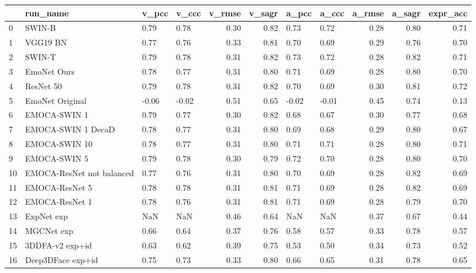 \begin{tabular}{llllrrllrrr}
\toprule
{} &                   run\_name & v\_pcc & v\_ccc &  v\_rmse &  v\_sagr & a\_pcc & a\_ccc &  a\_rmse &  a\_sagr &  expr\_acc \\
\midrule
0  &                     SWIN-B &  0.79 &  0.78 &    0.30 &    0.82 &  0.73 &  0.72 &    0.28 &    0.80 &      0.71 \\
1  &                   VGG19 BN &  0.77 &  0.76 &    0.33 &    0.81 &  0.70 &  0.69 &    0.29 &    0.76 &      0.70 \\
2  &                     SWIN-T &  0.79 &  0.78 &    0.31 &    0.82 &  0.73 &  0.72 &    0.28 &    0.82 &      0.71 \\
3  &                EmoNet Ours &  0.78 &  0.77 &    0.31 &    0.80 &  0.71 &  0.69 &    0.28 &    0.80 &      0.70 \\
4  &                  ResNet 50 &  0.79 &  0.78 &    0.31 &    0.82 &  0.70 &  0.69 &    0.30 &    0.81 &      0.72 \\
5  &            EmoNet Original & -0.06 & -0.02 &    0.51 &    0.65 & -0.02 & -0.01 &    0.45 &    0.74 &      0.13 \\
6  &               EMOCA-SWIN 1 &  0.79 &  0.77 &    0.30 &    0.82 &  0.68 &  0.67 &    0.30 &    0.77 &      0.68 \\
7  &         EMOCA-SWIN 1 DecaD &  0.78 &  0.77 &    0.31 &    0.80 &  0.69 &  0.68 &    0.29 &    0.80 &      0.67 \\
8  &              EMOCA-SWIN 10 &  0.78 &  0.77 &    0.31 &    0.80 &  0.71 &  0.71 &    0.28 &    0.80 &      0.71 \\
9  &               EMOCA-SWIN 5 &  0.79 &  0.78 &    0.30 &    0.79 &  0.72 &  0.70 &    0.28 &    0.80 &      0.70 \\
10 &  EMOCA-ResNet not balanced &  0.77 &  0.76 &    0.31 &    0.80 &  0.70 &  0.69 &    0.28 &    0.82 &      0.69 \\
11 &             EMOCA-ResNet 5 &  0.78 &  0.78 &    0.31 &    0.81 &  0.71 &  0.69 &    0.28 &    0.82 &      0.69 \\
12 &             EMOCA-ResNet 1 &  0.78 &  0.76 &    0.31 &    0.81 &  0.71 &  0.69 &    0.28 &    0.79 &      0.70 \\
13 &                 ExpNet exp &   NaN &   NaN &    0.46 &    0.64 &   NaN &   NaN &    0.37 &    0.67 &      0.44 \\
14 &                 MGCNet exp &  0.66 &  0.64 &    0.37 &    0.76 &  0.58 &  0.57 &    0.33 &    0.78 &      0.57 \\
15 &            3DDFA-v2 exp+id &  0.63 &  0.62 &    0.39 &    0.75 &  0.53 &  0.50 &    0.34 &    0.73 &      0.52 \\
16 &          Deep3DFace exp+id &  0.75 &  0.73 &    0.33 &    0.80 &  0.66 &  0.65 &    0.31 &    0.78 &      0.65 \\
\bottomrule
\end{tabular}
